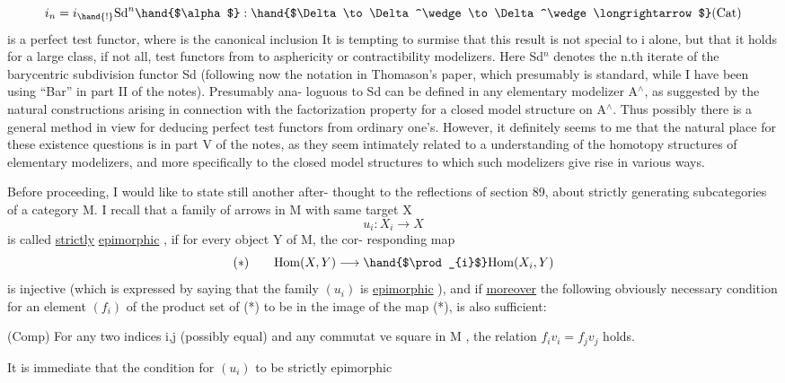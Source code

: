 \[i_n = i_{\hand{!}}\mathrm{Sd}^n\hand{$\alpha$} : \hand{$\Delta\to\Delta^\wedge\to\Delta^\wedge\longrightarrow$}(\mathrm{Cat})\]
is a perfect test functor, where \hand{$\alpha:\Delta\to\Delta^\wedge$} is the canonical inclusion
It is tempting to surmise that this result is not special to i alone,
but that it holds for a large class, if not all, test functors from
\hand{$\Delta$} to asphericity or contractibility modelizers. Here Sd$^n$ denotes the
n.th iterate of the barycentric subdivision functor Sd (following
now the notation in Thomason's paper, which presumably is standard,
while I have been using ``Bar'' in part II of the notes). Presumably  ana-%
loguous  to Sd can be defined in any elementary modelizer A$^\wedge$,
as suggested by the natural constructions arising\unsure{\xout{,}} in connection with
the factorization property for a closed model structure on A$^\wedge$. Thus
possibly there is a general method in view for deducing perfect test
functors from ordinary one's. However, it definitely seems to me that
the natural place for these existence questions is in part V of the
notes, as they seem intimately related to a  understanding of
the homotopy structures of  elementary modelizers, and more
\margin{$\uparrow$}specifically to the closed model structures to which such modelizers
\margin{$\lfloor$}give rise in various ways.

\hand{* * *}

\margin{$\downarrow$}Before proceeding, I would like to state still another after-%
thought to the reflections of section 89, about strictly generating
subcategories of a category M. I recall that a family of arrows in M
with same target X
\[u_i : X_i \longrightarrow X\]
is called \uline{strictly} \uline{epimorphic} , if for every object Y of M, the cor-%
responding map
\[(*)\qquad \mathrm{Hom}(X,Y)\longrightarrow \hand{$\prod_{i}$}\mathrm{Hom}(X_i,Y)\]
is injective (which is expressed by saying that the family $(u_i)$ is
\uline{epimorphic} ), and if \uline{moreover} the  following obviously
necessary condition for an element $(f_i)$ of the product set of (*) to
be in the image of the map (*), is also sufficient:

(Comp) For any two indices i,j (possibly equal) and any commutat%
ve square
in M , the relation $f_iv_i = f_jv_j$ holds.

It is immediate that the condition for $(u_i)$ to be strictly epimorphic

